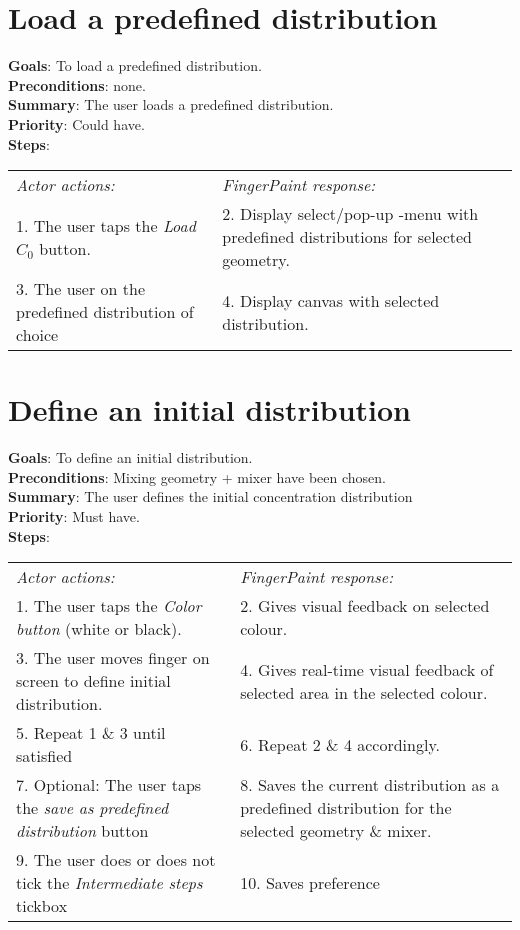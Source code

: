 \begin{appendices}
  \section{Load a predefined distribution}
  \textbf{Goals}: To load a predefined distribution.\\
  \textbf{Preconditions}: none.\\
  \textbf{Summary}: The user loads a predefined distribution.\\
  \textbf{Priority}: Could have.\\
  \textbf{Steps}: \\
  \begin{tabular}{ p{} p{} }
  	\emph{Actor actions:} & \emph{FingerPaint response:} \\
	1. The user taps the \emph{Load $C_0$} button. & 2. Display select/pop-up -menu with predefined distributions for selected geometry. \\
	3. The user on the predefined distribution of choice & 4.	Display canvas with selected distribution. \\
  \end{tabular}

  \section{Define an initial distribution}
  \textbf{Goals}: To define an initial distribution.\\
  \textbf{Preconditions}: Mixing geometry + mixer have been chosen.\\
  \textbf{Summary}: The user defines the initial concentration distribution\\
  \textbf{Priority}: Must have.\\
  \textbf{Steps}: \\
  \begin{tabular}{ p{} p{} }
  	\emph{Actor actions:} & \emph{FingerPaint response:} \\
	1. The user taps the \emph{Color button} (white or black). & 2. Gives visual feedback on selected colour. \\
	3. The user moves finger on screen to define initial distribution. & 4. Gives real-time visual feedback of selected area in the selected colour.\\
    5. Repeat 1 \& 3 until satisfied & 6.	Repeat 2 \& 4 accordingly. \\
    7.	Optional: The user taps the \emph{save as predefined distribution} button  & 8.	Saves the current distribution as a predefined distribution for the selected geometry \& mixer.\\
    9.	The user does or does not tick the \emph{Intermediate steps} tickbox & 10. Saves preference
  \end{tabular}


\end{appendices}
